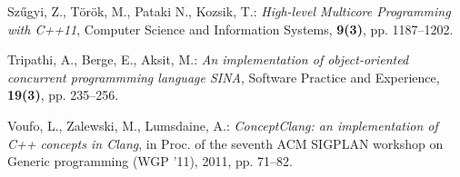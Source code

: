\documentclass{article}
\begin{document}
\begin{thebibliography}{10}
Sz\H{u}gyi, Z., T\"or\"ok, M., Pataki N., Kozsik, T.: \emph{High-level Multicore Programming with C++11},
Computer Science and Information Systems, \textbf{9(3)}, pp. 1187--1202.

Tripathi, A., Berge, E., Aksit, M.: \emph{An implementation of object-oriented concurrent
programmming language SINA}, Software Practice and Experience, \textbf{19(3)}, pp. 235--256.

Voufo, L., Zalewski, M., Lumsdaine, A.: \emph{ConceptClang: an implementation of C++ concepts in Clang},
in Proc. of the seventh ACM SIGPLAN workshop on Generic programming (WGP '11), 2011, pp. 71--82.

\end{thebibliography}
\end{document}
